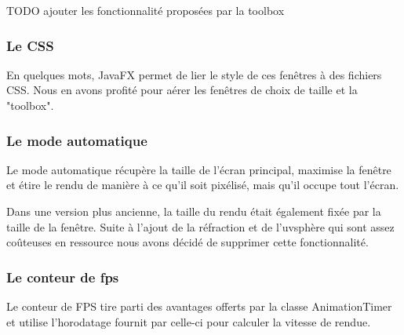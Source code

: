 TODO ajouter les fonctionnalité proposées par la toolbox

\subsubsection{Le CSS}

En quelques mots, JavaFX permet de lier le style de ces fenêtres à des fichiers CSS. Nous en avons profité pour aérer les fenêtres de choix de taille et la "toolbox".

\subsubsection{Le mode automatique}

Le mode automatique récupère la taille de l'écran principal, maximise la fenêtre et étire le rendu de manière à ce qu'il soit pixélisé, mais qu'il occupe tout l'écran.

Dans une version plus ancienne, la taille du rendu était également fixée par la taille de la fenêtre. Suite à l'ajout de la réfraction et de l'uvsphère qui sont assez coûteuses en ressource nous avons décidé de supprimer cette fonctionnalité.

\subsubsection{Le conteur de fps}

Le conteur de FPS tire parti des avantages offerts par la classe AnimationTimer et utilise l'horodatage fournit par celle-ci pour calculer la vitesse de rendue.
